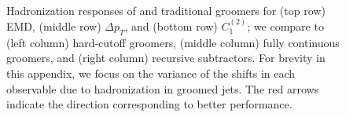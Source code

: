 \begin{figure}[p]
{    }
    \\
\caption{
    Hadronization responses of \PIRANHA{} and traditional groomers for (top row) EMD, (middle row) \(\Delta p_T\), and (bottom row) \(C_1^{(2)}\);
    we compare  to (left column) hard-cutoff groomers, (middle column) fully continuous groomers, and (right column) recursive subtractors.
    For brevity in this appendix, we focus on the variance of the shifts in each observable due to hadronization in groomed jets.
    The red arrows indicate the direction corresponding to better performance.
}
\label{fig:pvhfrenzy}
\end{figure}




